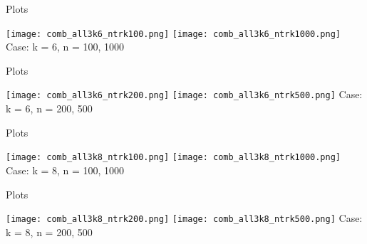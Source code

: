 \documentclass[aspectratio=169,compress,10pt]{beamer} %
\begin{document}


\begin{frame}{Plots}
\begin{adjustwidth}{-2em}{-2em}
\texttt{[image: comb\_all3k6\_ntrk100.png]}
\texttt{[image: comb\_all3k6\_ntrk1000.png]}
Case: k = 6, n = 100, 1000
\end{adjustwidth}
\end{frame}

\begin{frame}{Plots}
\begin{adjustwidth}{-2em}{-2em}
\texttt{[image: comb\_all3k6\_ntrk200.png]}
\texttt{[image: comb\_all3k6\_ntrk500.png]}
Case: k = 6, n = 200, 500
\end{adjustwidth}
\end{frame}

\begin{frame}{Plots}
\begin{adjustwidth}{-2em}{-2em}
\texttt{[image: comb\_all3k8\_ntrk100.png]}
\texttt{[image: comb\_all3k8\_ntrk1000.png]}
Case: k = 8, n = 100, 1000
\end{adjustwidth}
\end{frame}

\begin{frame}{Plots}
\begin{adjustwidth}{-2em}{-2em}
\texttt{[image: comb\_all3k8\_ntrk200.png]}
\texttt{[image: comb\_all3k8\_ntrk500.png]}
Case: k = 8, n = 200, 500
\end{adjustwidth}
\end{frame}
\end{document}
